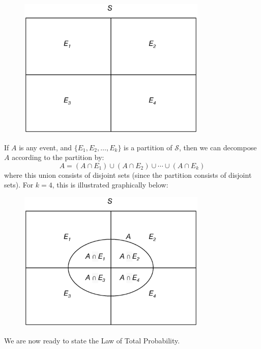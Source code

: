 \documentclass[12pt]{article}
\theoremstyle{definition}
\theoremstyle{remark}
\def\cals{{\mathcal S}}
\begin{document}
\begin{figure}[H]
\centering
\includegraphics[width=9cm]{partition.eps}
\end{figure}

If $A$ is any event, and $\{E_1, E_2, \dots, E_k\}$ is a partition of $\cals$, then we can decompose $A$ according to the partition by:
\[
A = (A \cap E_1) \cup (A \cap E_2) \cup \cdots \cup (A \cap E_k)
\]
where this union consists of disjoint sets (since the partition consists of disjoint sets). For $k = 4$, this is illustrated graphically below:
\begin{figure}[H]
\centering
\includegraphics[width=9cm]{partition2.eps}
\end{figure}

We are now ready to state the Law of Total Probability.
\end{document}
